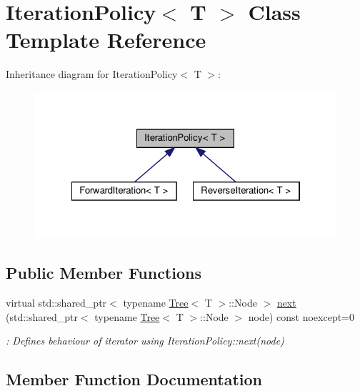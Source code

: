\hypertarget{classIterationPolicy}{}\section{Iteration\+Policy$<$ T $>$ Class Template Reference}
\label{classIterationPolicy}


Inheritance diagram for Iteration\+Policy$<$ T $>$\+:\nopagebreak
\begin{figure}[H]
\begin{center}
\leavevmode
\includegraphics[width=322pt]{classIterationPolicy__inherit__graph}
\end{center}
\end{figure}
\subsection*{Public Member Functions}
\begin{DoxyCompactItemize}
\item 
virtual std\+::shared\+\_\+ptr$<$ typename \hyperlink{classTree}{Tree}$<$ T $>$\+::Node $>$ \hyperlink{classIterationPolicy_a69a898482a3a2ec09fd6efec002bace8}{next} (std\+::shared\+\_\+ptr$<$ typename \hyperlink{classTree}{Tree}$<$ T $>$\+::Node $>$ node) const noexcept=0
\begin{DoxyCompactList}\small\item\em \+: Defines behaviour of iterator using Iteration\+Policy\+::next(node) \end{DoxyCompactList}\end{DoxyCompactItemize}


\subsection{Member Function Documentation}
\mbox{\label{classIterationPolicy_a69a898482a3a2ec09fd6efec002bace8}} 
